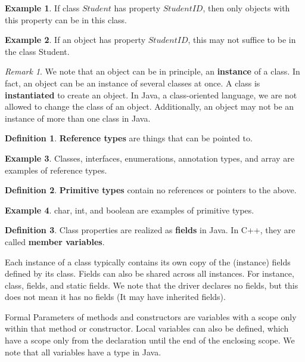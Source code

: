 \documentclass[11pt]{article}
\theoremstyle{plain} %
\theoremstyle{definition}
\newtheorem*{definition}{Definition} %
\theoremstyle{example}
\newtheorem*{example}{Example}
\theoremstyle{remark}
\newtheorem*{remark}{Remark}
\begin{document}
\begin{example}
If class $Student$ has property $StudentID$, then only objects with this property can be in this class. 
\end{example}


\begin{example}
If an object has property $StudentID$, this may not suffice to be in the class Student. 
\end{example}

\begin{remark}
We note that an object can be in principle, an \textbf{instance} of a class. In fact, an object can be an instance of several classes at once. A class is \textbf{instantiated} to create an object. In Java, a class-oriented language, we are not allowed to change the class of an object. Additionally, an object may not be an instance of more than one class in Java. 
\end{remark}

\begin{definition}
\textbf{Reference types} are things that can be pointed to. 
\end{definition}

\begin{example}
Classes, interfaces, enumerations, annotation types, and array are examples of reference types. 
\end{example}

\begin{definition}
\textbf{Primitive types} contain no references or pointers to the above.
\end{definition}



\begin{example}
char, int, and boolean are examples of primitive types. 
\end{example}


\begin{definition}
Class properties are realized as \textbf{fields} in Java. In C++, they are called \textbf{member variables}.
\end{definition}

Each instance of a class typically contains its own copy of the (instance) fields defined by its class. Fields can also be shared across all instances. For instance, class, fields, and static fields. We note that the driver declares no fields, but this does not mean it has no fields (It may have inherited fields).


Formal Parameters of methods and constructors are variables with a scope only within that method or constructor. Local variables can also be defined, which have a scope only from the declaration until the end of the enclosing scope. We note that all variables have a type in Java.
\end{document}
